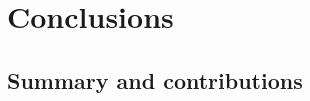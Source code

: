\chapter{Conclusions} %
\label{chap:conclusions}
\section{Summary and contributions}
\label{conclusions:summary}







